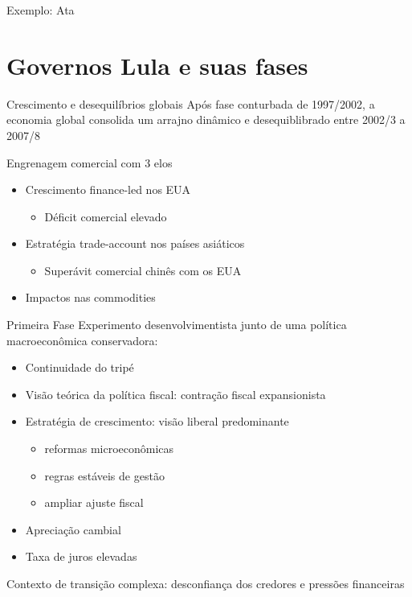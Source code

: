 \documentclass[presentation]{beamer}
\begin{document}
\begin{frame}[label={sec:orgfe34296}]{Exemplo: Ata}
\end{frame}
\section{Governos Lula e suas fases}
\label{sec:org5e26f66}

\begin{frame}[label={sec:org1afcf8f}]{Crescimento e desequilíbrios globais \cite{carneiroSupremaciaDosMercados2006}}
Após fase conturbada de 1997/2002, a economia global consolida um arrajno dinâmico e desequiblibrado entre 2002/3 a 2007/8

\alert{Engrenagem comercial com 3 elos}
\begin{itemize}
\item Crescimento finance-led nos EUA
\begin{itemize}
\item Déficit comercial elevado
\end{itemize}
\item Estratégia trade-account nos países asiáticos
\begin{itemize}
\item Superávit comercial chinês com os EUA
\end{itemize}
\item Impactos nas commodities
\end{itemize}
\end{frame}

\begin{frame}[label={sec:org5528e8f}]{Primeira Fase}
Experimento desenvolvimentista junto de uma política macroeconômica conservadora:
\begin{itemize}
\item Continuidade do tripé
\item Visão teórica da \alert{política fiscal:} contração fiscal expansionista
\item \alert{Estratégia de crescimento:} visão liberal predominante
\begin{itemize}
\item reformas microeconômicas
\item regras estáveis de gestão
\item ampliar ajuste fiscal
\end{itemize}
\item Apreciação cambial
\item Taxa de juros elevadas
\end{itemize}

\alert{Contexto de transição complexa:} desconfiança dos credores e pressões financeiras
\end{frame}
\end{document}
